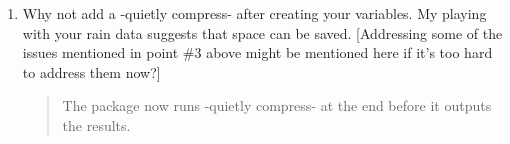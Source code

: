 \documentclass{article}[11pt]
\begin{document}
\begin{enumerate}
\begin{quote}
        In terms of allowing the user to name variables, the package creates dozens to hundreds of variables depending on the number of years in the data. Allowing the user to name each one would be impractical. Instead, we now allow users the option to define \texttt{outstub()} which adds a custom prefix to the variables. This allows the user to run \texttt{wxsum} without running into the problem of variable names already existing.
    \end{quote}

    \item Why not add a -quietly compress- after creating your variables. My playing with your rain data suggests that space can be saved. [Addressing some of the issues mentioned in point \#3 above might be mentioned here if it’s too hard to address them now?] 
    \begin{quote}
        The package now runs -quietly compress- at the end before it outputs the results.
    \end{quote}
    
\end{enumerate}
\end{document}
